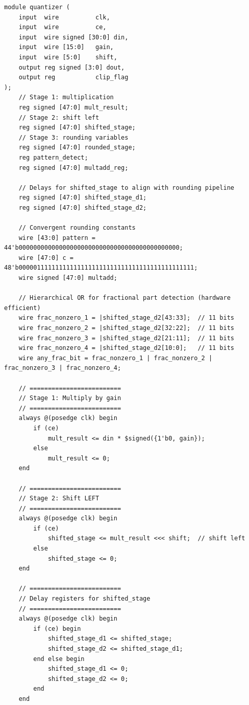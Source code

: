 \begin{lstlisting}[style={prettyverilog}, caption={Verilog code for the 4-bit convergent quantizer with gain and dynamic shift.}, label={lst:verilog_quantizer}]
module quantizer (
    input  wire          clk,
    input  wire          ce,
    input  wire signed [30:0] din,   
    input  wire [15:0]   gain,       
    input  wire [5:0]    shift,      
    output reg signed [3:0] dout,
    output reg           clip_flag
);
    // Stage 1: multiplication
    reg signed [47:0] mult_result;
    // Stage 2: shift left
    reg signed [47:0] shifted_stage;
    // Stage 3: rounding variables
    reg signed [47:0] rounded_stage; 
    reg pattern_detect;
    reg signed [47:0] multadd_reg;
    
    // Delays for shifted_stage to align with rounding pipeline
    reg signed [47:0] shifted_stage_d1;  
    reg signed [47:0] shifted_stage_d2;  
    
    // Convergent rounding constants
    wire [43:0] pattern = 44'b00000000000000000000000000000000000000000000;
    wire [47:0] c = 48'b000001111111111111111111111111111111111111111111; 
    wire signed [47:0] multadd;
    
    // Hierarchical OR for fractional part detection (hardware efficient)
    wire frac_nonzero_1 = |shifted_stage_d2[43:33];  // 11 bits
    wire frac_nonzero_2 = |shifted_stage_d2[32:22];  // 11 bits  
    wire frac_nonzero_3 = |shifted_stage_d2[21:11];  // 11 bits
    wire frac_nonzero_4 = |shifted_stage_d2[10:0];   // 11 bits
    wire any_frac_bit = frac_nonzero_1 | frac_nonzero_2 | frac_nonzero_3 | frac_nonzero_4;
    
    // =========================
    // Stage 1: Multiply by gain
    // =========================
    always @(posedge clk) begin
        if (ce)
            mult_result <= din * $signed({1'b0, gain});
        else
            mult_result <= 0;
    end
    
    // =========================
    // Stage 2: Shift LEFT
    // =========================
    always @(posedge clk) begin
        if (ce)
            shifted_stage <= mult_result <<< shift;  // shift left
        else
            shifted_stage <= 0;
    end
    
    // =========================
    // Delay registers for shifted_stage
    // =========================
    always @(posedge clk) begin
        if (ce) begin
            shifted_stage_d1 <= shifted_stage;    
            shifted_stage_d2 <= shifted_stage_d1; 
        end else begin
            shifted_stage_d1 <= 0;
            shifted_stage_d2 <= 0;
        end
    end
    

\end{lstlisting}
